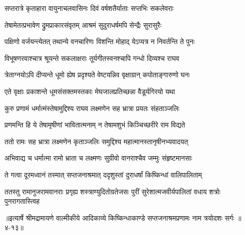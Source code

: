 \twolineshloka
{सप्तरात्रे कृताहारा वायुनाचलवासिनः}
{दिवं वर्षशतैर्याताः सप्तभिः सकलेवराः} %

\twolineshloka
{तेषामेतत्प्रभावेण द्रुमप्राकारसंवृतम्}
{आश्रमं सुदुराधर्षमपि सेन्द्रैः सुरासुरैः} %

\twolineshloka
{पक्षिणो वर्जयन्त्येतत् तथान्ये वनचारिणः}
{विशन्ति मोहाद् येऽप्यत्र न निवर्तन्ति ते पुनः} %

\twolineshloka
{विभूषणरवाश्चात्र श्रूयन्ते सकलाक्षराः}
{तूर्यगीतस्वनश्चापि गन्धो दिव्यश्च राघव} %

\twolineshloka
{त्रेताग्नयोऽपि दीप्यन्ते धूमो ह्येष प्रदृश्यते}
{वेष्टयन्निव वृक्षाग्रान् कपोताङ्गारुणो घनः} %

\twolineshloka
{एते वृक्षाः प्रकाशन्ते धूमसंसक्तमस्तकाः}
{मेघजालप्रतिच्छन्ना वैडूर्यगिरयो यथा} %

\twolineshloka
{कुरु प्रणामं धर्मात्मंस्तेषामुद्दिश्य राघव}
{लक्ष्मणेन सह भ्रात्रा प्रयतः संहताञ्जलिः} %

\twolineshloka
{प्रणमन्ति हि ये तेषामृषीणां भावितात्मनाम्}
{न तेषामशुभं किञ्चिच्छरीरे राम विद्यते} %

\twolineshloka
{ततो रामः सह भ्रात्रा लक्ष्मणेन कृताञ्जलिः}
{समुद्दिश्य महात्मानस्तानृषीनभ्यवादयत्} %

\twolineshloka
{अभिवाद्य च धर्मात्मा रामो भ्राता च लक्ष्मणः}
{सुग्रीवो वानराश्चैव जम्मुः संहृष्टमानसाः} %

\twolineshloka
{ते गत्वा दूरमध्वानं तस्मात् सप्तजनाश्रमात्}
{ददृशुस्तां दुराधर्षां किष्किन्धां वालिपालिताम्} %

\twolineshloka
{ततस्तु रामानुजरामवानराः प्रगृह्य शस्त्राण्युदितोग्रतेजसः}
{पुरीं सुरेशात्मजवीर्यपालितां वधाय शत्रोः पुनरागतास्त्विह} %


॥इत्यार्षे श्रीमद्रामायणे वाल्मीकीये आदिकाव्ये किष्किन्धाकाण्डे सप्तजनाश्रमप्रणामः नाम त्रयोदशः सर्गः ॥४-१३॥
